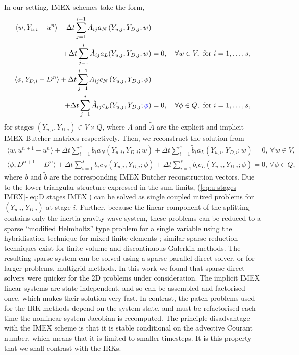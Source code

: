 \documentclass[a4paper, 12pt]{article}
\newcommand{\revisedus}[1]{#1}
\newcommand{\revisedC}[1]{{\color{blue}#1}}
\begin{document}
In our setting, IMEX schemes take the form,
\begin{align}
    \nonumber
    \langle w, Y_{u,i}-u^n \rangle + \Delta t \sum_{j=1}^{i-1} A_{ij} a_N\left(
    Y_{u,j}, Y_{D,j}; w\right) & \\
\qquad    + \Delta t \sum_{j=1}^i \tilde{A}_{ij} a_L(Y_{u,j}, Y_{D,j}; w)
    & = 0, \label{eq:u stages IMEX}
  \quad \forall w \in V,\mbox{ for }i=1,\ldots,s, \\
  \nonumber
    \langle \phi, Y_{D,i}-D^n \rangle + \Delta t \sum_{j=1}^{i-1} A_{ij} c_N\left(
    Y_{u,j}, Y_{D,j}; \phi\right) & \\
    + \Delta t \sum_{j=1}^i \tilde{A}_{ij} c_L(Y_{u,j}, Y_{D,j}; \revisedC{\phi})
    & = 0, \label{eq:D stages IMEX}
      \quad \forall \phi \in Q,\mbox{ for }i=1,\ldots,s,
\end{align}
for stages $(Y_{u,i},Y_{D,i}) \in V \times Q$,
where $A$ and $\tilde{A}$ are the explicit and implicit IMEX Butcher
matrices respectively. Then, we reconstruct the solution from
\begin{align}
  \label{eq:mass u}
  \langle w, u^{n+1} - u^n\rangle + \Delta t\sum_{i=1}^s b_i
  a_N(Y_{u,i}, Y_{D,i}; w)
  + \Delta t \sum_{i=1}^s \tilde{b}_i
  a_L(Y_{u,i}, Y_{D,i}; w)=0,\, \forall w \in V, \\
  \label{eq:mass D}
    \langle \phi, D^{n+1} - D^n\rangle + \Delta t\sum_{i=1}^s b_i
  c_N(Y_{u,i}, Y_{D,i}; \phi)
  + \Delta t \sum_{i=1}^s \tilde{b}_i
    c_L(Y_{u,i}, Y_{D,i}; \phi)=0,\, \forall \phi \in Q,
\end{align}
where $b$ and $\tilde{b}$ are the corresponding IMEX Butcher
reconstruction vectors. Due to the lower triangular structure
expressed in the sum limits, (\ref{eq:u stages IMEX}-\ref{eq:D stages
  IMEX}) can be solved as single coupled mixed problems for
$(Y_{u,i},Y_{D,i})$ at stage $i$. Further, \revisedus{because the
  linear component of the splitting contains only the inertia-gravity
  wave system,} these problems can be reduced to a sparse ``modified
Helmholtz'' type problem for a single variable using the hybridisation
technique for mixed finite elements
\citep{boffi2013mixed,cockburn2004characterization}; similar sparse
reduction techniques exist for finite volume and discontinuous
Galerkin methods. The resulting sparse system can be solved using a
sparse parallel direct solver, or for larger problems, multigrid
methods. In this work we found that sparse direct solvers were quicker
for the 2D problems under consideration. The implicit IMEX linear
systems are state independent, and so can be assembled and factorised
once, which makes their solution very fast. In contrast, the patch
problems used for the IRK methods depend on the system state, and must
be refactorised \revisedus{each time the nonlinear system Jacobian is
  recomputed}. The principle disadvantage with the IMEX scheme is that
it is stable conditional on the advective Courant number, which means
that it is limited to smaller timesteps.  It is this property that we
shall contrast with the IRKs.
\end{document}
